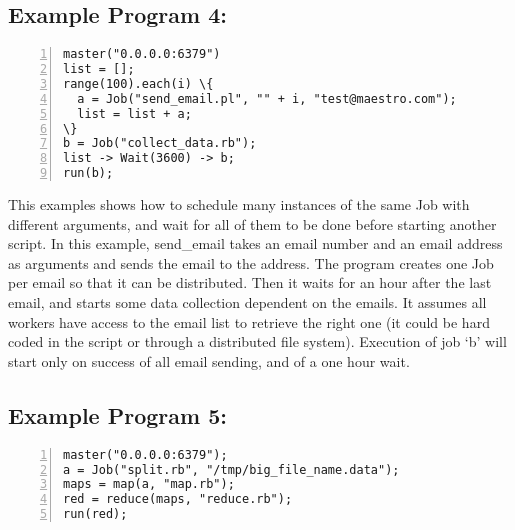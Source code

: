 \subsection*{Example Program 4:}
\begin{Verbatim}[numbers=left,commandchars=\\\{\}]
master("0.0.0.0:6379")
list = [];
range(100).each(i) \{
  a = Job("send_email.pl", "" + i, "test@maestro.com");
  list = list + a;
\}
b = Job("collect_data.rb");
list -> Wait(3600) -> b;
run(b);
\end{Verbatim}

This examples shows how to schedule many instances of the same Job with different
arguments, and wait for all of them to be done before starting another script.
In this example, send\_email takes an email number and an email address as arguments
and sends the email to the address. The program creates one Job per email so that it
can be distributed. Then it waits for an hour after the last email, and starts some data
collection dependent on the emails. It assumes all workers have access to the email list
to retrieve the right one (it could be hard coded in the script or through a distributed
file system).
Execution of job `b' will start only on success of all email sending,
and of a one hour wait.

\subsection*{Example Program 5:}
\begin{Verbatim}[numbers=left,commandchars=\\\{\}]
master("0.0.0.0:6379");
a = Job("split.rb", "/tmp/big_file_name.data");
maps = map(a, "map.rb");
red = reduce(maps, "reduce.rb");
run(red);
\end{Verbatim}

